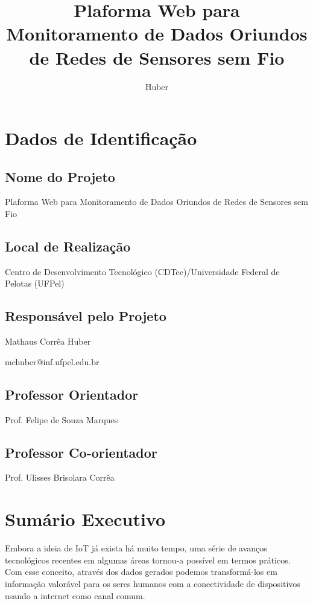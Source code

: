 \documentclass[tcc-proposta]{texufpel}
\title{Plaforma Web para Monitoramento de Dados Oriundos de Redes de Sensores sem Fio}
\author{Huber}{Mathaus Corrêa}
\begin{document}

\maketitle 
\sloppy

\chapter{Dados de Identificação}

\section{Nome do Projeto}
Plaforma Web para Monitoramento de Dados Oriundos de Redes de Sensores sem Fio

\section{Local de Realização}
Centro de Desenvolvimento Tecnológico (CDTec)/Universidade Federal de Pelotas (UFPel)

\section{Responsável pelo Projeto}
Mathaus Corrêa Huber

mchuber@inf.ufpel.edu.br

\section{Professor Orientador}
Prof. Felipe de Souza Marques

\section{Professor Co-orientador}
Prof. Ulisses Brisolara Corrêa

\chapter{Sumário Executivo}
Embora a ideia de IoT já exista há muito tempo, uma série de avanços tecnológicos recentes em algumas áreas tornou-a possível em termos práticos. Com esse conceito, através dos dados gerados podemos transformá-los em informação valorável para os seres humanos com a conectividade de dispositivos usando a internet como canal comum. 
\\
\end{document}
